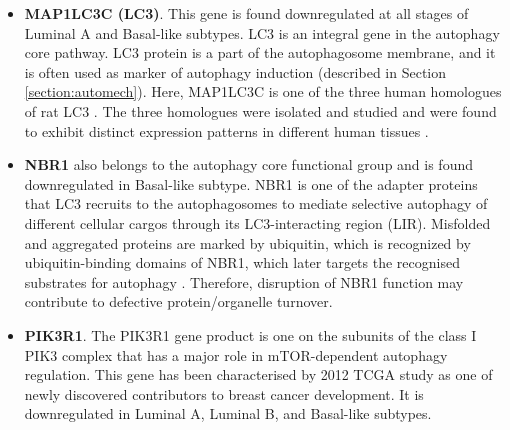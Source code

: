 \begin{itemize}

    \item \textbf{MAP1LC3C (LC3)}. This gene is found downregulated at all stages of Luminal A and Basal-like subtypes. LC3 is an integral gene in the autophagy core pathway. LC3 protein is a part of the autophagosome membrane, and it is often used as marker of autophagy induction (described in Section \ref{section:automech}). Here, MAP1LC3C is one of the three human homologues of rat LC3 \cite{he2003post}. The three homologues were isolated and studied and were found to exhibit distinct expression patterns in different human tissues \cite{he2003post}.
    

    

\item \textbf{NBR1} also belongs to the autophagy core functional group and is found downregulated in Basal-like subtype. NBR1 is one of the adapter proteins that LC3 recruits to the autophagosomes to mediate selective autophagy of different cellular cargos through its LC3-interacting region (LIR). Misfolded and aggregated proteins are marked by ubiquitin, which is recognized by ubiquitin-binding domains of NBR1, which later targets the recognised substrates for autophagy \cite{DebnathTheCancer}. Therefore, disruption of NBR1 function may contribute to defective protein/organelle turnover.



\item \textbf{PIK3R1}. The PIK3R1 gene product is one on the subunits of the class I PIK3 complex that has a major role in mTOR-dependent autophagy regulation. This gene has been characterised by 2012 TCGA study \cite{TCGAResearchNetwork2012} as one of newly discovered contributors to breast cancer development. It is downregulated in Luminal A, Luminal B, and Basal-like subtypes.










\end{itemize}



